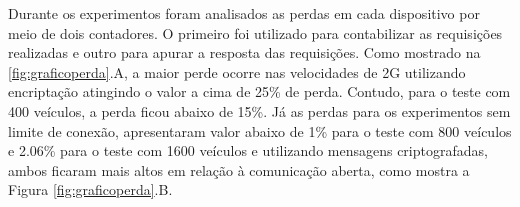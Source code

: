 \documentclass[
	12pt,				%
	oneside,			%
	a4paper,			%
	english,			%
	brazil				%
	]{abntex2ppgsi}
\begin{document}
Durante os experimentos foram analisados as perdas em cada dispositivo por meio de dois contadores. O primeiro foi utilizado para contabilizar as requisições realizadas  e outro para apurar a resposta das requisições. Como mostrado na \ref{fig:graficoperda}.A, a maior perde ocorre nas velocidades de 2G utilizando encriptação atingindo o valor a cima de 25\% de perda. Contudo, para o teste com 400 veículos, a perda ficou abaixo de 15\%. Já as perdas para os experimentos  sem limite de conexão, apresentaram valor abaixo de 1\% para o teste com 800 veículos e 2.06\% para o teste com 1600 veículos e utilizando mensagens criptografadas, ambos ficaram mais altos em relação à comunicação aberta, como mostra a Figura \ref{fig:graficoperda}.B. 







\end{document}
